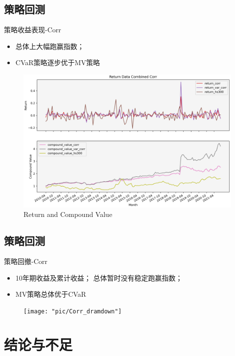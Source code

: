 \documentclass[CJK,aspectratio=43]{beamer}  %
\begin{document}
\subsection{策略回测}
\begin{frame}{策略收益表现-Corr}
	\begin{itemize}
	\item 总体上大幅跑赢指数； 
	\item CVaR策略逐步优于MV策略
	\end{itemize}
	\begin{figure}
		\centering
		\includegraphics[width=0.8\linewidth]{pic/Corr}
		\caption{Return and Compound Value}
		\label{fig:corr}
	\end{figure}
\end{frame}

\subsection{策略回测}
\begin{frame}{策略回撤-Corr}
	\begin{itemize}
		\item 10年期收益及累计收益； 总体暂时没有稳定跑赢指数； 
		\item MV策略总体优于CVaR
	\end{itemize}
	\begin{figure}
		\centering
		\texttt{[image: "pic/Corr\_dramdown"]}
		\caption{}
		\label{fig:corrdramdown}
	\end{figure}
\end{frame}

\section{结论与不足}
\end{document}
